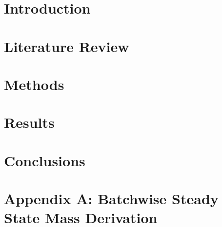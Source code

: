 \documentclass[edeposit,fullpage,hidelinks]{uiucthesis2018}
\begin{document}
\tableofcontents
\listoftables
\listoffigures


\pagebreak
\mainmatter

\chapter{Introduction}


\chapter{Literature Review}


\chapter{Methods}


\chapter{Results}


\chapter{Conclusions}


\chapter*{Appendix A: Batchwise Steady State Mass Derivation}


\backmatter



\end{document}
